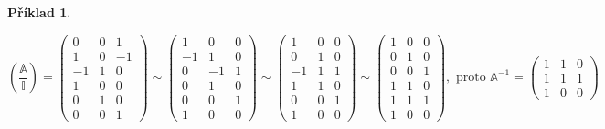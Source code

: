\documentclass[12pt]{article}
\newtheorem{expl}[theorem]{Příklad}
\begin{document}
\begin{expl}
\begin{itemize}
$$
\left(\frac{\mathbb{A}}{\mathbb{I}} \right)=
\begin{pmatrix}
0 & 0 & 1 \\
1 & 0 & -1 \\
-1 & 1 & 0 \\ \hline
1 & 0 & 0 \\
0 & 1 & 0 \\
0 & 0 & 1 
\end{pmatrix}
\sim
\begin{pmatrix}
1 & 0 & 0 \\
-1 & 1 & 0 \\
0 & -1 & 1 \\ \hline
0 & 1 & 0 \\
0 & 0 & 1 \\
1 & 0 & 0
\end{pmatrix}
\sim
\begin{pmatrix}
1 & 0 & 0 \\
0 & 1 & 0 \\
-1 & 1 & 1 \\ \hline
1 & 1 & 0 \\
0 & 0 & 1 \\
1 & 0 & 0
\end{pmatrix}
\sim
\begin{pmatrix}
1 & 0 & 0 \\
0 & 1 & 0 \\
0 & 0 & 1 \\ \hline
1 & 1 & 0 \\
1 & 1 & 1 \\
1 & 0 & 0
\end{pmatrix}, \text{ proto } \mathbb{A}^{-1}=
\begin{pmatrix}
1 & 1 & 0 \\
1 & 1 & 1 \\
1 & 0 & 0
\end{pmatrix}
$$
\end{itemize}
\end{expl}
\end{document}
